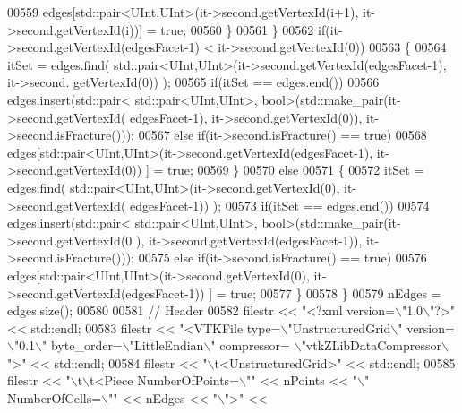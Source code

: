 \begin{DoxyCode}
00559                     edges[std::pair<UInt,UInt>(it->second.getVertexId(i+1), it->second.getVertexId(i))] = \textcolor{keyword}{
      true};
00560             \}
00561         \}
00562         \textcolor{keywordflow}{if}(it->second.getVertexId(edgesFacet-1) < it->second.getVertexId(0))
00563         \{
00564             itSet = edges.find( std::pair<UInt,UInt>(it->second.getVertexId(edgesFacet-1), it->second.
      getVertexId(0)) );
00565             \textcolor{keywordflow}{if}(itSet == edges.end())
00566                 edges.insert(std::pair< std::pair<UInt,UInt>, \textcolor{keywordtype}{bool}>(std::make\_pair(it->second.getVertexId(
      edgesFacet-1), it->second.getVertexId(0)), it->second.isFracture()));
00567             \textcolor{keywordflow}{else} \textcolor{keywordflow}{if}(it->second.isFracture() == \textcolor{keyword}{true})
00568                 edges[std::pair<UInt,UInt>(it->second.getVertexId(edgesFacet-1), it->second.getVertexId(0))
      ] = \textcolor{keyword}{true};
00569         \}
00570         \textcolor{keywordflow}{else}
00571         \{
00572             itSet = edges.find( std::pair<UInt,UInt>(it->second.getVertexId(0), it->second.getVertexId(
      edgesFacet-1)) );
00573             \textcolor{keywordflow}{if}(itSet == edges.end())
00574                 edges.insert(std::pair< std::pair<UInt,UInt>, \textcolor{keywordtype}{bool}>(std::make\_pair(it->second.getVertexId(0
      ), it->second.getVertexId(edgesFacet-1)), it->second.isFracture()));
00575             \textcolor{keywordflow}{else} \textcolor{keywordflow}{if}(it->second.isFracture() == \textcolor{keyword}{true})
00576                 edges[std::pair<UInt,UInt>(it->second.getVertexId(0), it->second.getVertexId(edgesFacet-1))
      ] = \textcolor{keyword}{true};
00577         \}
00578     \}
00579     nEdges = edges.size();
00580 
00581     \textcolor{comment}{// Header}
00582     filestr << \textcolor{stringliteral}{"<?xml version=\(\backslash\)"1.0\(\backslash\)"?>"} << std::endl;
00583     filestr << \textcolor{stringliteral}{"<VTKFile type=\(\backslash\)"UnstructuredGrid\(\backslash\)" version=\(\backslash\)"0.1\(\backslash\)" byte\_order=\(\backslash\)"LittleEndian\(\backslash\)" compressor=
      \(\backslash\)"vtkZLibDataCompressor\(\backslash\)">"} << std::endl;
00584     filestr << \textcolor{stringliteral}{"\(\backslash\)t<UnstructuredGrid>"} << std::endl;
00585     filestr << \textcolor{stringliteral}{"\(\backslash\)t\(\backslash\)t<Piece NumberOfPoints=\(\backslash\)""} << nPoints << \textcolor{stringliteral}{"\(\backslash\)" NumberOfCells=\(\backslash\)""} << nEdges << \textcolor{stringliteral}{"\(\backslash\)">"} << 

\end{DoxyCode}
